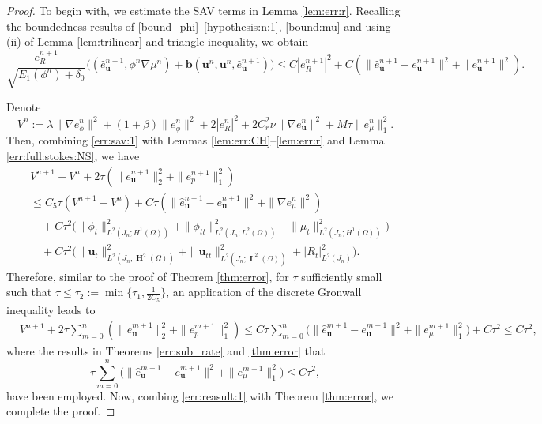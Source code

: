 \begin{proof}
	To begin with, we estimate the SAV terms in Lemma \ref{lem:err:r}. Recalling the boundedness results of \eqref{bound_phi}--\eqref{hypothesis:n:1}, \eqref{bound:mu}  and using (ii) of Lemma \ref{lem:trilinear} and triangle inequality, we obtain
	\begin{equation}  \label{err:sav:1} 
	  \frac{e_R^{n+1}}{\sqrt{E_1(\phi^n)+\delta_0}} \big( (\widehat{e}_{\bm u}^{n+1}, \phi^n \nabla \mu^n)+ \bm b(\bm u^n,  \bm u^n, \widehat e_{\bm u}^{n+1} ) \big)
			 \le C |e_R^{n+1}|^2 + C(\|\widehat{e}_{\bm u}^{n+1}-e_{\bm u}^{n+1}\|^2 + \|e_{\bm u}^{n+1}\|^2).
	\end{equation}
	
	Denote 
	\[
	V^n:= \lambda \|\nabla e_\phi^n\|^2 + (1+\beta)\| e_\phi^n\|^2 + 2|e_R^n|^2+ 2C_r^2\nu \|\nabla  
	e_{\bm u}^n\|^2 +  M\tau \|e_\mu^n\|_1^2.
	\]
	Then, combining \eqref{err:sav:1} with Lemmas \ref{lem:err:CH}--\ref{lem:err:r} and Lemma \ref{err:full:stokes:NS},  we have
	\begin{equation*} \label{err:full_rate:1}
		\begin{aligned}
			& V^{n+1} -V^n + 2\tau(\|e_{\bm u}^{n+1}\|_2^2+ \|e_p^{n+1}\|_1^2)\\
			& \leq C_5\tau (V^{n+1} + V^n) +C\tau( \|\widehat{e}_{\bm u}^{n+1}-e_{\bm u}^{n+1}\|^2 + \|\nabla e_\mu^{n}\|^2)\\
			& \quad + C\tau^2 \big(\|\phi_t\|_{L^2(J_n ; H^1(\Omega))}^2 +\|\phi_{tt}\|_{L^2(J_n ; L^2(\Omega))}^2+  \|\mu_t\|_{L^2(J_n ; H^1(\Omega))}^2\big)\\
			& \quad +C\tau^2 \big( \|\bm u_t\|_{L^2(J_n ; \mbfH^2(\Omega))}^2+\|\bm u_{tt}\|_{L^2(J_n; \mbfL^2(\Omega))}^2+ |R_t|_{L^2(J_n)}^2\big).
		\end{aligned}
	\end{equation*}
	Therefore, similar to the proof of Theorem \ref{thm:error}, for $\tau$ sufficiently small such that  $\tau \le  \tau_2:=\min \{\tau_1, \frac{1}{2C_{5}}\}$, an application of the discrete Gronwall inequality leads to 
	\begin{equation} \label{err:reasult:1}
		\begin{aligned}
			& V^{n+1} +2\tau \sum_{m=0}^n (\|e_{\bm u}^{m+1}\|_2^2+\|e_p^{m+1}\|_1^2) 
			  \le C \tau \sum_{m=0}^n\big(\|\widehat{e}_{\bm u}^{m+1}-{e}_{\bm u}^{m+1}\|^2  + \|e_\mu^{m+1}\|_1^2 \big) + C \tau^2  \le  C\tau^2,
		\end{aligned}
	\end{equation}
	where   the results in Theorems \ref{err:sub_rate} and \ref{thm:error} that
	\begin{equation*} 
		\tau \sum_{m=0}^n\big(\|\widehat{e}_{\bm u}^{m+1}-{e}_{\bm u}^{m+1}\|^2  + \|e_\mu^{m+1}\|_1^2 \big) 	\leq  C \tau^2,
	\end{equation*}
	have been employed. Now, combing \eqref{err:reasult:1} with Theorem  \ref{thm:error}, we complete the proof.
\end{proof} 

